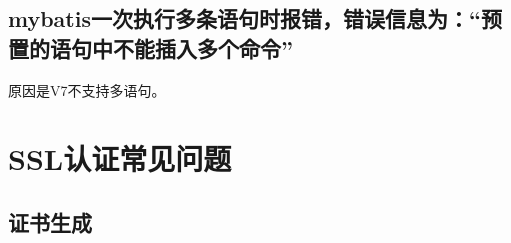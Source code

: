 \documentclass[a4,10pt,oneside,english]{sphinxmanual}
\begin{document}
\subsection{mybatis一次执行多条语句时报错，错误信息为：“预置的语句中不能插入多个命令”}
\label{\detokenize{interface/jdbc-v7:mybatis}}
原因是V7不支持多语句。


\section{SSL认证常见问题}
\label{\detokenize{interface/SSL:ssl}}\label{\detokenize{interface/SSL:id1}}\label{\detokenize{interface/SSL::doc}}

\subsection{证书生成}
\label{\detokenize{interface/SSL:id2}}
\end{document}
